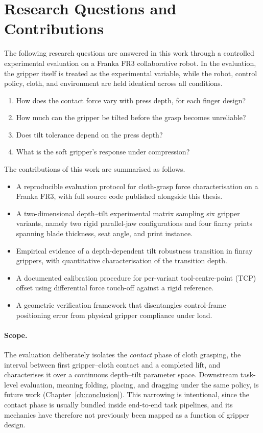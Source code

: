 \section{Research Questions and Contributions}

The following research questions are answered in this work through a
controlled experimental evaluation on a Franka FR3 collaborative robot. In
the evaluation, the gripper itself is treated as the experimental variable,
while the robot, control policy, cloth, and environment are held identical
across all conditions.
\begin{enumerate}
  \item How does the contact force vary with press depth, for each finger
        design?
  \item How much can the gripper be tilted before the grasp becomes
        unreliable?
  \item Does tilt tolerance depend on the press depth?
  \item What is the soft gripper's response under compression?
\end{enumerate}

\noindent The contributions of this work are summarised as follows.
\begin{itemize}
  \item A reproducible evaluation protocol for cloth-grasp force characterisation
        on a Franka FR3, with full source code published alongside this thesis.
  \item A two-dimensional depth--tilt experimental matrix sampling six
        gripper variants, namely two rigid parallel-jaw configurations and
        four finray prints spanning blade thickness, seat angle, and print
        instance.
  \item Empirical evidence of a depth-dependent tilt robustness transition
        in finray grippers, with quantitative characterisation of the
        transition depth.
  \item A documented calibration procedure for per-variant tool-centre-point
        (TCP) offset using differential force touch-off against a rigid
        reference.
  \item A geometric verification framework that disentangles control-frame
        positioning error from physical gripper compliance under load.
\end{itemize}

\paragraph{Scope.} The evaluation deliberately isolates the \emph{contact}
phase of cloth grasping, the interval between first gripper--cloth contact
and a completed lift, and characterises it over a continuous depth--tilt
parameter space. Downstream task-level evaluation, meaning folding,
placing, and dragging under the same policy, is future work
(Chapter~\ref{ch:conclusion}). This narrowing is intentional, since the
contact phase is usually bundled inside end-to-end task pipelines, and
its mechanics have therefore not previously been mapped as a function of
gripper design.

